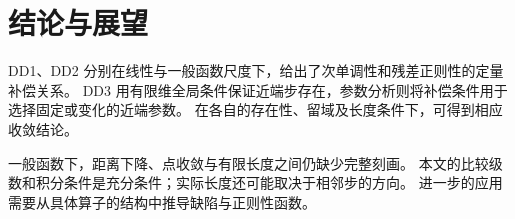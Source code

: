 \section{结论与展望}\label{sec:conclusion}

DD1、DD2 分别在线性与一般函数尺度下，给出了次单调性和残差正则性的定量补偿关系。
DD3 用有限维全局条件保证近端步存在，参数分析则将补偿条件用于选择固定或变化的近端参数。
在各自的存在性、留域及长度条件下，可得到相应收敛结论。

一般函数下，距离下降、点收敛与有限长度之间仍缺少完整刻画。
本文的比较级数和积分条件是充分条件；实际长度还可能取决于相邻步的方向。
进一步的应用需要从具体算子的结构中推导缺陷与正则性函数。
